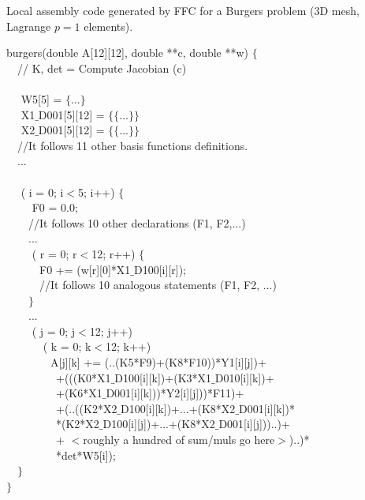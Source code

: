 \documentclass[conference]{IEEEtran}
\begin{document}
\begin{algorithm}[t]
\small
\caption{Local assembly code generated by FFC for a Burgers problem (3D mesh, Lagrange $p=1$ elements).}
\label{code:burgers}
 burgers(double A[12][12], double **c, double **w) $\lbrace$\\
~~// K, det = Compute Jacobian (c) \\
~~\\
~~ W5[5] = $\lbrace$...$\rbrace$\\
~~ X1$\_$D001[5][12] = $\lbrace\lbrace$...$\rbrace\rbrace$\\
~~ X2$\_$D001[5][12] = $\lbrace\lbrace$...$\rbrace\rbrace$\\
~~//It follows 11 other basis functions definitions.\\
~~...\\
~~\\
~~ ( i = 0; i$<$5; i++) $\lbrace$\\
~~~~ F0 = 0.0;\\
~~~~//It follows 10 other declarations (F1, F2,...)\\
~~~~...\\
~~~~ ( r = 0; r$<$12; r++) $\lbrace$\\
~~~~~~F0 += (w[r][0]*X1$\_$D100[i][r]);\\
~~~~~~//It follows 10 analogous statements (F1, F2, ...)\\
~~~~$\rbrace$\\
~~~~...\\
~~~~ ( j = 0; j$<$12; j++) \\
~~~~~~ ( k = 0; k$<$12; k++) \\
~~~~~~~~A[j][k] += (..(K5*F9)+(K8*F10))*Y1[i][j])+\\
~~~~~~~~~+(((K0*X1$\_$D100[i][k])+(K3*X1$\_$D010[i][k])+\\
~~~~~~~~~+(K6*X1$\_$D001[i][k]))*Y2[i][j]))*F11)+\\
~~~~~~~~~+(..((K2*X2$\_$D100[i][k])+...+(K8*X2$\_$D001[i][k])*\\
~~~~~~~~~*(K2*X2$\_$D100[i][j])+...+(K8*X2$\_$D001[i][j]))..)+\\
~~~~~~~~~+ $<$roughly a hundred of sum/muls go here$>$)..)*\\
~~~~~~~~~*det*W5[i]);\\
~~$\rbrace$ \\
$\rbrace$
\end{algorithm}
\end{document}
